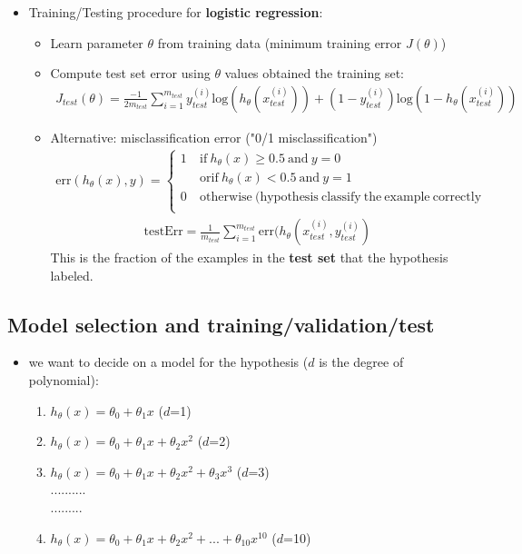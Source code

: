 \documentclass[a4paper,12pt]{report}
\begin{document}
\begin{itemize}
\item Training/Testing procedure for \textbf{logistic regression}:
\begin{itemize}
	\item Learn parameter $\theta$ from training data (minimum training error $J(\theta)$)
	\item Compute test set error using $\theta$ values obtained the training set:
	\begin{align}
	J_{test} (\theta) = \frac{-1}{2 m_{test}} \sum_{i=1} ^{m_{test}} y_{test} ^{(i)} \mathrm{log}(h_{\theta}(x_{test}^{(i)})) + (1-y_{test} ^{(i)}) \mathrm{log}(1-h_{\theta}(x_{test}^{(i)}))
	\end{align}
	\item Alternative: misclassification error ("0/1 misclassification")
	\begin{align*}
	\mathrm{err}(h_{\theta}(x), y)=
	\begin{cases}
		1  & \mathrm{\ if\ } h_{\theta}(x) \geq 0.5 \mathrm{\ and \ }y=0\\
		   & \mathrm{\ or if\ } h_{\theta}(x) < 0.5 \mathrm{\ and \ }y=1\\
		0  & \mathrm{\ otherwise \ (hypothesis \ classify \ the \ example\  correctly } \\
	\end{cases}
	\end{align*} 
	\begin{align}
	\mathrm{testErr}=\frac{1}{m_{test}} \sum_{i=1} ^{m_{test}} \mathrm{err}(h_{\theta}(x_{test} ^{(i)}, y_{test} ^{(i)})
	\end{align}
	This is the fraction of the examples in the \textbf{test set} that the hypothesis labeled.
\end{itemize}
\end{itemize}

\subsection{Model selection and training/validation/test}
\begin{itemize}
\item we want to decide on a model for the hypothesis ($d$ is the degree of polynomial):
\begin{enumerate}
\item $h_{\theta}(x) = \theta_0 + \theta_1 x$  ($d$=1)
\item $h_{\theta}(x) = \theta_0 + \theta_1 x + \theta_2 x^2$  ($d$=2)
\item $h_{\theta}(x) = \theta_0 + \theta_1 x + \theta_2 x^2 + \theta_3 x^3$  ($d$=3)\\ 
.......... \\
.........
\item $h_{\theta}(x) = \theta_0 + \theta_1 x + \theta_2 x^2 + ... +  \theta_{10} x^{10}$  ($d$=10)
\end{enumerate}
\end{itemize}
\end{document}

